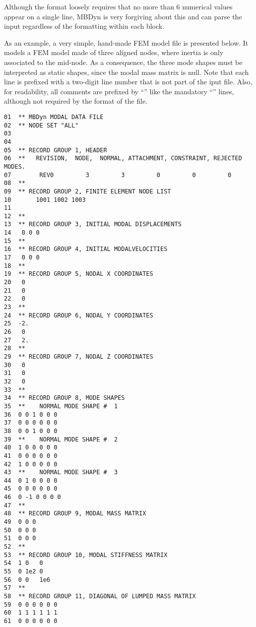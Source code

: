 Although the format loosely requires that no more than 6 numerical values 
appear on a single line, MBDyn is very forgiving about this and can parse
the input regardless of the formatting within each block.

As an example, a very simple, hand-made FEM model file is presented below.
It models a FEM model made of three aligned nodes, where inertia 
is only associated to the mid-node.
As a consequence, the three mode shapes must be interpreted as static
shapes, since the modal mass matrix is null.
Note that each line is prefixed with a two-digit line number 
that is not part of the iput file.
Also, for readability, all comments are prefixed by ``\kw{**}''
like the mandatory ``'' lines, although not required 
by the format of the file.

{\small
\begin{verbatim}
01  ** MBDyn MODAL DATA FILE
02  ** NODE SET "ALL" 
03    
04    
05  ** RECORD GROUP 1, HEADER
06  **   REVISION,  NODE,  NORMAL, ATTACHMENT, CONSTRAINT, REJECTED MODES.
07        REV0         3         3         0         0         0
08  **
09  ** RECORD GROUP 2, FINITE ELEMENT NODE LIST
10       1001 1002 1003
11  
12  **
13  ** RECORD GROUP 3, INITIAL MODAL DISPLACEMENTS
14   0 0 0
15  **
16  ** RECORD GROUP 4, INITIAL MODALVELOCITIES
17   0 0 0
18  **
19  ** RECORD GROUP 5, NODAL X COORDINATES
20   0
21   0
22   0
23  **
24  ** RECORD GROUP 6, NODAL Y COORDINATES
25  -2.
26   0
27   2.
28  **
29  ** RECORD GROUP 7, NODAL Z COORDINATES
30   0
31   0
32   0
33  **
34  ** RECORD GROUP 8, MODE SHAPES
35  **    NORMAL MODE SHAPE #  1
36  0 0 1 0 0 0
37  0 0 0 0 0 0
38  0 0 1 0 0 0
39  **    NORMAL MODE SHAPE #  2
40  1 0 0 0 0 0
41  0 0 0 0 0 0
42  1 0 0 0 0 0
43  **    NORMAL MODE SHAPE #  3
44  0 1 0 0 0 0
45  0 0 0 0 0 0
46  0 -1 0 0 0 0
47  **
48  ** RECORD GROUP 9, MODAL MASS MATRIX
49  0 0 0
50  0 0 0
51  0 0 0
52  **
53  ** RECORD GROUP 10, MODAL STIFFNESS MATRIX
54  1 0   0
55  0 1e2 0
56  0 0   1e6
57  **
58  ** RECORD GROUP 11, DIAGONAL OF LUMPED MASS MATRIX
59  0 0 0 0 0 0
60  1 1 1 1 1 1
61  0 0 0 0 0 0
\end{verbatim}
}

